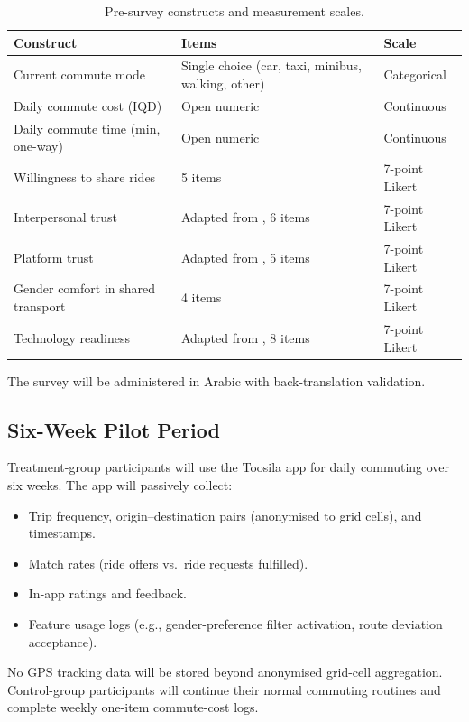 \documentclass[12pt,a4paper]{article}
\begin{document}
\begin{table}[htbp]
  \centering
  \caption{Pre-survey constructs and measurement scales.}
  \label{tab:presurvey}
  \begin{tabular}{@{}lll@{}}
    \toprule
    \textbf{Construct} & \textbf{Items} & \textbf{Scale} \\
    \midrule
    Current commute mode & Single choice (car, taxi, minibus, walking, other) & Categorical \\
    Daily commute cost (IQD) & Open numeric & Continuous \\
    Daily commute time (min, one-way) & Open numeric & Continuous \\
    Willingness to share rides & 5 items & 7-point Likert \\
    Interpersonal trust & Adapted from \citet{Gefen2003}, 6 items & 7-point Likert \\
    Platform trust & Adapted from \citet{McKnight2002}, 5 items & 7-point Likert \\
    Gender comfort in shared transport & 4 items & 7-point Likert \\
    Technology readiness & Adapted from \citet{Parasuraman2015}, 8 items & 7-point Likert \\
    \bottomrule
  \end{tabular}
\end{table}

The survey will be administered in Arabic with back-translation validation.

\subsection{Six-Week Pilot Period}

Treatment-group participants will use the Toosila app for daily commuting over six weeks. The app will passively collect:

\begin{itemize}[nosep]
  \item Trip frequency, origin--destination pairs (anonymised to grid cells), and timestamps.
  \item Match rates (ride offers vs.\ ride requests fulfilled).
  \item In-app ratings and feedback.
  \item Feature usage logs (e.g., gender-preference filter activation, route deviation acceptance).
\end{itemize}

No GPS tracking data will be stored beyond anonymised grid-cell aggregation. Control-group participants will continue their normal commuting routines and complete weekly one-item commute-cost logs.
\end{document}
